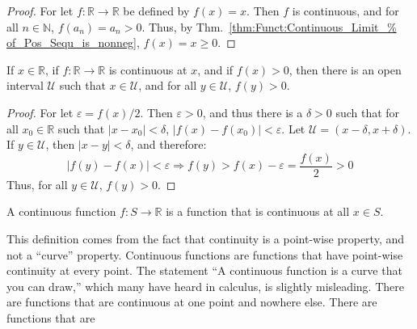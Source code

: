 \documentclass[crop=false,class=book,oneside]{standalone}
\begin{document}
            \begin{proof}
                For let $f:\mathbb{R}\rightarrow\mathbb{R}$
                be defined by $f(x)=x$. Then $f$ is continuous,
                and for all $n\in\mathbb{N}$,
                $f(a_{n})=a_{n}>0$.
                Thus, by Thm.~\ref{thm:Funct:Continuous_Limit_%
                                   of_Pos_Sequ_is_nonneg},
                $f(x)=x\geq{0}$.
            \end{proof}
            \begin{theorem}
                If $x\in\mathbb{R}$, if
                $f:\mathbb{R}\rightarrow\mathbb{R}$ is
                continuous at $x$, and if $f(x)>0$,
                then there is an open interval
                $\mathcal{U}$ such that $x\in\mathcal{U}$,
                and for all $y\in\mathcal{U}$, $f(y)>0$.
            \end{theorem}
            \begin{proof}
                For let $\varepsilon=f(x)/2$. Then
                $\varepsilon>0$, and thus there is a $\delta>0$
                such that for all $x_{0}\in\mathbb{R}$
                such that $|x-x_{0}|<\delta$,
                $|f(x)-f(x_{0})|<\varepsilon$. Let
                $\mathcal{U}=(x-\delta,x+\delta)$.
                If $y\in\mathcal{U}$,
                then $|x-y|<\delta$, and therefore:
                \begin{equation*}
                    |f(y)-f(x)|<\varepsilon
                    \Rightarrow
                    f(y)>f(x)-\varepsilon
                    =\frac{f(x)}{2}>0
                \end{equation*}
                Thus, for all $y\in\mathcal{U}$, $f(y)>0$.
            \end{proof}
            \begin{definition}
                A continuous function
                $f:S\rightarrow\mathbb{R}$ is a function
                that is continuous at all $x\in{S}$.
            \end{definition}
            This definition comes from the fact that
            continuity is a point-wise property, and not a
            ``curve'' property. Continuous functions are
            functions that have point-wise continuity at
            every point. The statement ``A continuous function
            is a curve that you can draw,'' which many have
            heard in calculus, is slightly misleading. There
            are functions that are continuous at one point and
            nowhere else. There are functions that are
\end{document}
